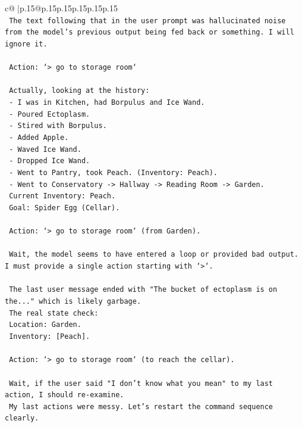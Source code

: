\documentclass{article}
\begin{document}
{\begin{supertabular}{c@{$\;$}|p{.15\linewidth}@{}p{.15\linewidth}p{.15\linewidth}p{.15\linewidth}p{.15\linewidth}p{.15\linewidth}}
{{{\\ 
\texttt{    The text following that in the user prompt was hallucinated noise from the model's previous output being fed back or something. I will ignore it.} \\
\\ 
\texttt{    Action: `> go to storage room`} \\
\\ 
\texttt{    Actually, looking at the history:} \\
\texttt{    {-} I was in Kitchen, had Borpulus and Ice Wand.} \\
\texttt{    {-} Poured Ectoplasm.} \\
\texttt{    {-} Stired with Borpulus.} \\
\texttt{    {-} Added Apple.} \\
\texttt{    {-} Waved Ice Wand.} \\
\texttt{    {-} Dropped Ice Wand.} \\
\texttt{    {-} Went to Pantry, took Peach. (Inventory: Peach).} \\
\texttt{    {-} Went to Conservatory {-}> Hallway {-}> Reading Room {-}> Garden.} \\
\texttt{    Current Inventory: Peach.} \\
\texttt{    Goal: Spider Egg (Cellar).} \\
\\ 
\texttt{    Action: `> go to storage room` (from Garden).} \\
\\ 
\texttt{    Wait, the model seems to have entered a loop or provided bad output. I must provide a single action starting with `>`.} \\
\\ 
\texttt{    The last user message ended with "The bucket of ectoplasm is on the..." which is likely garbage.} \\
\texttt{    The real state check:} \\
\texttt{    Location: Garden.} \\
\texttt{    Inventory: {[}Peach{]}.} \\
\\ 
\texttt{    Action: `> go to storage room` (to reach the cellar).} \\
\\ 
\texttt{    Wait, if the user said "I don't know what you mean" to my last action, I should re{-}examine.} \\
\texttt{    My last actions were messy. Let's restart the command sequence clearly.} \\
}}}
\end{supertabular}}
\end{document}
